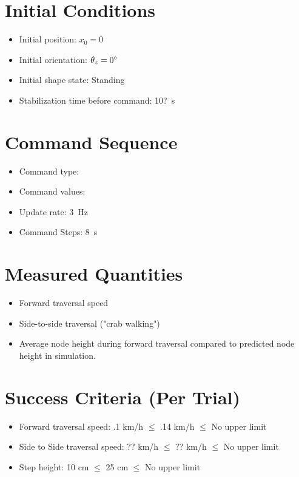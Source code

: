\documentclass[11pt]{article}
\begin{document}
\section*{Initial Conditions}
\begin{itemize}[noitemsep]
    \item Initial position: $x_0 = 0$
    \item Initial orientation: $\theta_z = 0 {\degree}$
    \item Initial shape state: Standing
    \item Stabilization time before command: 10?~s
\end{itemize}

\section*{Command Sequence}
\begin{itemize}[noitemsep]
    \item Command type: \underline{\hspace{5 cm}}
    \item Command values: \underline{\hspace{5 cm}}
    \item Update rate: 3~Hz
    \item Command Steps: 8~s
\end{itemize}

\section*{Measured Quantities}
\begin{itemize}[noitemsep]
    \item Forward traversal speed
    \item Side-to-side traversal ("crab walking")
    \item Average node height during forward traversal compared to predicted node height in simulation. 
\end{itemize}

\section*{Success Criteria (Per Trial)}
\begin{itemize}[noitemsep]
    \item Forward traversal speed: .1 km/h  $\leq$ .14 km/h $\leq$ No upper limit
    \item Side to Side traversal speed: ?? km/h  $\leq$ ?? km/h $\leq$ No upper limit
    \item  Step height: 10 cm  $\leq$ 25 cm $\leq$ No upper limit
\end{itemize}
\end{document}
